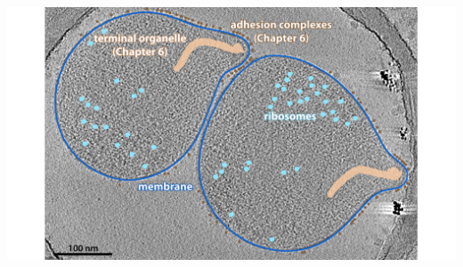 \documentclass[]{tufte-book}
\begin{document}
\includegraphics{img/02_static/2_1_Mgenitalium}


\end{document}
